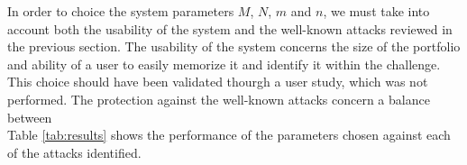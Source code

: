 \documentclass[11pt,a4paper]{article}
\theoremstyle{defn, nobreak=true}
\begin{document}
	In order to choice the system parameters $M$, $N$, $m$ and $n$, we must take into account both the usability of the system and the well-known attacks reviewed in the previous section. The usability of the system concerns the size of the portfolio and ability of a user to easily memorize it and identify it within the challenge. This choice should have been validated thourgh a user study, which was not performed. The protection against the well-known attacks concern a balance between \\


	Table \ref{tab:results} shows the performance of the parameters chosen against each of the attacks identified.











\end{document}
